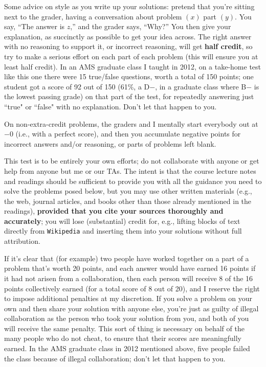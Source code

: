 \documentclass[12pt]{article}
\begin{document}
Some advice on style as you write up your solutions: pretend that you're sitting next to the grader, having a conversation about problem $( x )$ part $( y )$. You say, ``The answer is $z$,'' and the grader says, ``Why?'' You then give your explanation, as succinctly as possible to get your idea across. The right answer with no reasoning to support it, or incorrect reasoning, will get \textbf{half credit}, so try to make a serious effort on each part of each problem (this will ensure you at least half credit). In an AMS graduate class I taught in 2012, on a take-home test like this one there were 15 true/false questions, worth a total of 150 points; one student got a score of 92 out of 150 (61\%, a D$-$, in a graduate class where B$-$ is the lowest passing grade) on that part of the test, for repeatedly answering just ``true" or ``false" with no explanation. Don't let that happen to you.  

On non-extra-credit problems, the graders and I mentally start everybody out at $-0$ (i.e., with a perfect score), and then you accumulate negative points for
incorrect answers and/or reasoning, or parts of problems left blank.

This test is to be entirely your own efforts; do not collaborate with
anyone or get help from anyone but me or our TAs. The intent is that the course lecture notes and readings should be sufficient to provide you with all the guidance you need to solve the problems posed below, but you may use other written materials (e.g., the web, journal articles, and books other than those already mentioned in the readings),
\textbf{provided that you cite your sources thoroughly and accurately}; you
will lose (substantial) credit for, e.g., lifting blocks of text directly
from \texttt{Wikipedia} and inserting them into your solutions without full
attribution.

If it's clear that (for example) two people have worked together on a part
of a problem that's worth 20 points, and each answer would have earned 16
points if it had not arisen from a collaboration, then each person will
receive 8 of the 16 points collectively earned (for a total score of 8 out
of 20), and I reserve the right to impose additional penalties at my
discretion. If you solve a problem on your own and then share your solution
with anyone else, you're just as guilty of illegal collaboration as
the person who took your solution from you, and both of you will receive
the same penalty. This sort of thing is necessary on behalf of the many
people who do not cheat, to ensure that their scores are meaningfully
earned. In the AMS graduate class in 2012 mentioned above, five people failed the class because of illegal collaboration; don't let that happen to you.
\end{document}
